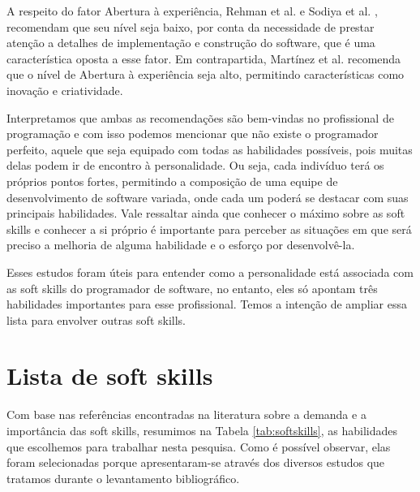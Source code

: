 A respeito do fator Abertura à experiência, Rehman et al. \cite{rehman:12} e Sodiya et al. \cite{sodiya:07}, recomendam que seu nível seja baixo, por conta da necessidade de prestar atenção a detalhes de implementação e construção do software, que é uma característica oposta a esse fator. Em contrapartida, Martínez et al. \cite{martinez:11} recomenda que o nível de Abertura à experiência seja alto, permitindo características como inovação e criatividade.

Interpretamos que ambas as recomendações são bem-vindas no profissional de programação e com isso podemos mencionar que não existe o programador perfeito, aquele que seja equipado com todas as habilidades possíveis, pois muitas delas podem ir de encontro à personalidade. Ou seja, cada indivíduo terá os próprios pontos fortes, permitindo a composição de uma equipe de desenvolvimento de software variada, onde cada um poderá se destacar com suas principais habilidades. Vale ressaltar ainda que conhecer o máximo sobre as soft skills e conhecer a si próprio é importante para perceber as situações em que será preciso a melhoria de alguma habilidade e o esforço por desenvolvê-la.

Esses estudos foram úteis para entender como a personalidade está associada com as soft skills do programador de software, no entanto, eles só apontam três habilidades importantes para esse profissional. Temos a intenção de ampliar essa lista para envolver outras soft skills.

\section{Lista de soft skills}
\label{sec:lista-ss}

Com base nas referências encontradas na literatura sobre a demanda e a importância das soft skills, resumimos na Tabela \ref{tab:softskills}, as habilidades que escolhemos para trabalhar nesta pesquisa. Como é possível observar, elas foram selecionadas porque apresentaram-se através dos diversos estudos que tratamos durante o levantamento bibliográfico.

